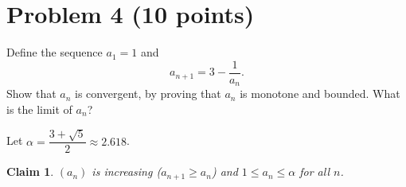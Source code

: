 \documentclass[11pt]{article}
\newtheorem*{claim}{Claim}
\begin{document}
\section*{Problem 4 (10 points)}
Define the sequence $a_1=1$ and
\[
  a_{n+1} = 3-\frac{1}{a_n}.
\]
Show that $a_n$ is convergent, by proving that $a_n$ is monotone and bounded.
What is the limit of $a_n$?


Let $\alpha = \dfrac{3+\sqrt5}{2}\approx 2.618$.

\begin{claim}
$(a_n)$ is increasing ($a_{n+1}\ge a_n$) and $1 \le a_n \le \alpha$ for all $n$.
\end{claim}
\end{document}
